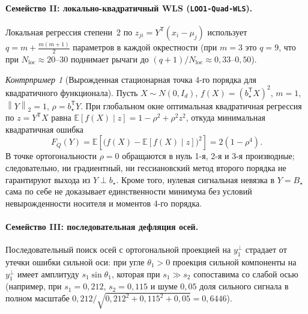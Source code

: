 \documentclass[11pt,a4paper]{article}
\numberwithin{equation}{section}
\theoremstyle{definition}
\theoremstyle{remark}
\newtheorem{example}[theorem]{Контрпример}
\newcommand{\E}{\mathbb{E}}
\newcommand{\T}{^{\mathsf T}}
\newcommand{\norm}[1]{\left\lVert #1 \right\rVert}
\begin{document}
\paragraph{Семейство II: локально-квадратичный WLS (\texttt{LOO1-Quad-WLS}).}
Локальная регрессия степени~2 по $z_{ji} = Y\T(x_i-\mu_j)$ использует $q = m + \frac{m(m+1)}{2}$
параметров в каждой окрестности (при $m=3$ это $q=9$, что при $N_{\mathrm{loc}} \approx 20\text{--}30$
поднимает рычаги до $(q+1)/N_{\mathrm{loc}} \approx 0{,}33\text{--}0{,}50$).

\begin{example}[Вырожденная стационарная точка 4-го порядка для квадратичного функционала]
\label{ex:quad-flat}
Пусть $X \sim N(0, I_d)$, $f(X) = (b_\star\T X)^2$, $m = 1$, $\norm{Y}_2 = 1$, $\rho = b_\star\T Y$.
При глобальном окне оптимальная квадратичная регрессия по $z = Y\T X$ равна
$\E[f(X) \mid z] = 1 - \rho^2 + \rho^2 z^2$, откуда минимальная квадратичная ошибка
\[
  F_Q(Y) = \E\!\left[\bigl(f(X) - \E[f(X)\mid z]\bigr)^2\right] = 2(1 - \rho^4).
\]
В точке ортогональности $\rho = 0$ обращаются в нуль 1-я, 2-я и 3-я производные;
следовательно, ни градиентный, ни гессиановский метод второго порядка не гарантируют выхода из $Y \perp b_\star$.
Кроме того, нулевая сигнальная невязка в $Y = B_\star$ сама по себе не доказывает единственности минимума
без условий невырожденности носителя и моментов 4-го порядка.
\end{example}

\paragraph{Семейство III: последовательная дефляция осей.}
Последовательный поиск осей с ортогональной проекцией на $y_1^\perp$ страдает от утечки
ошибки сильной оси: при угле $\theta_1 > 0$ проекция сильной компоненты на $y_1^\perp$
имеет амплитуду $s_1 \sin\theta_1$, которая при $s_1 \gg s_2$ сопоставима со слабой осью
(например, при $s_1 = 0{,}212$, $s_2 = 0{,}115$ и шуме $0{,}05$ доля сильного сигнала
в полном масштабе $0{,}212 / \sqrt{0{,}212^2 + 0{,}115^2 + 0{,}05} = 0{,}6446$).
\end{document}
